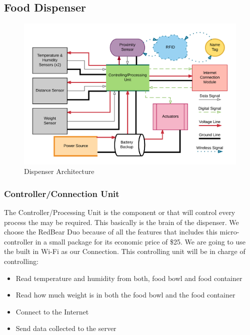 \documentclass[12pt]{article}
\begin{document}
\subsection{Food Dispenser}

\begin{figure}[!htb]
  \includegraphics[width=\textwidth]{Figures/ArchitectureDispenser}
  \caption{Dispenser Architecture}
  \label{fig:ArchDispenser}
\end{figure}

\subsubsection{Controller/Connection Unit}

The Controller/Processing Unit is the component or that will control every process the may be required. This basically is the brain of the dispenser. We choose the RedBear Duo because of all the features that includes this micro-controller in a small package for its economic price of \$25. We are going to use the built in Wi-Fi  as our Connection. This controlling unit will be in charge of controlling:

\begin{itemize}
  \item Read temperature and humidity from both, food bowl and food container
  \item Read how much weight is in both the food bowl and the food container
  \item Connect to the Internet
  \item Send data collected to the server
\end{itemize}
\end{document}
